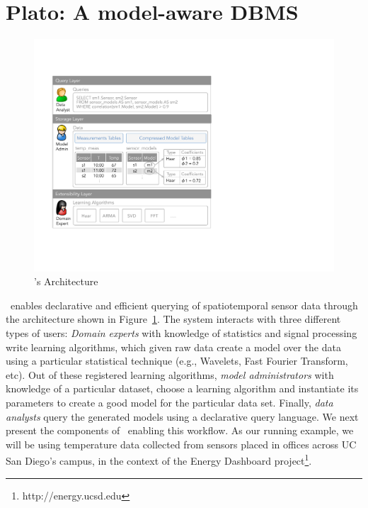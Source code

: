 
\section{Plato: A model-aware DBMS}
\label{sec:architecture}

\begin{figure}
\center
\includegraphics[width=\columnwidth]{fig-architecture2.pdf}
\caption{\projName's Architecture}
\label{fig:basic-architecture}
\vspace{-0.4cm}
\end{figure}

\projName\ enables declarative and efficient querying of spatiotemporal sensor data through the architecture shown in Figure~\ref{fig:basic-architecture}. The system interacts with three different types of users: \emph{Domain experts} with knowledge of statistics and signal processing write learning algorithms, which given raw data create a model over the data using a particular statistical technique (e.g., Wavelets, Fast Fourier Transform, etc).
Out of these registered learning algorithms, \emph{model administrators} with knowledge of a particular dataset, choose a learning algorithm and instantiate its parameters to create a good model for the particular data set. Finally, \emph{data analysts} query the generated models using a declarative query language. We next present the components of \projName\ enabling this workflow. As our running example, we will be using temperature data collected from sensors placed in offices across UC San Diego's campus, in the context of the Energy Dashboard project\footnote{http://energy.ucsd.edu}.

